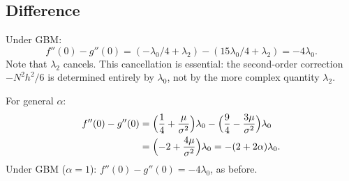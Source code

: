 \documentclass[11pt]{article}
\theoremstyle{definition}
\theoremstyle{remark}
\begin{document}
\subsection{Difference}

Under GBM:
\begin{equation}\label{eq:fg_second_diff}
f''(0) - g''(0) = (-\lambda_0/4 + \lambda_2)
- (15\lambda_0/4 + \lambda_2) = -4\lambda_0.
\end{equation}
Note that $\lambda_2$ cancels. This cancellation is essential: the
second-order correction $-N^2 h^2/6$ is determined entirely by
$\lambda_0$, not by the more complex quantity $\lambda_2$.

For general $\alpha$:
\begin{align}
f''(0) - g''(0)
&= \Bigl(\frac{1}{4} + \frac{\mu}{\sigma^2}\Bigr)\lambda_0
- \Bigl(\frac{9}{4} - \frac{3\mu}{\sigma^2}\Bigr)\lambda_0
\notag \\
&= \Bigl(-2 + \frac{4\mu}{\sigma^2}\Bigr)\lambda_0
= -(2 + 2\alpha)\lambda_0.
\label{eq:fg_diff_general}
\end{align}
Under GBM ($\alpha = 1$): $f''(0) - g''(0) = -4\lambda_0$, as
before.
\end{document}
